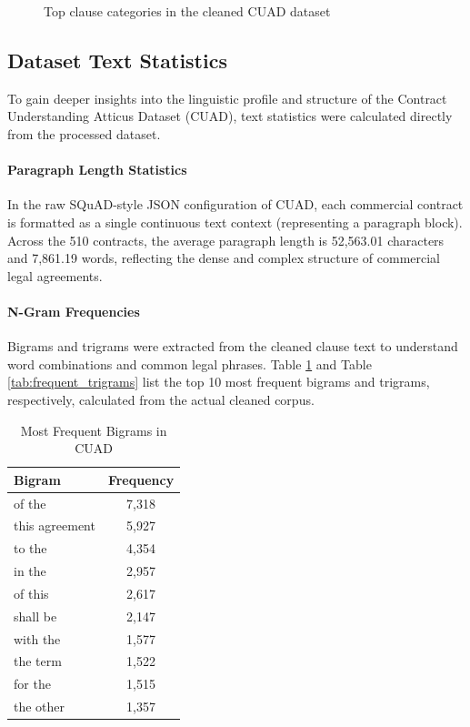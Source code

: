 \documentclass[12pt, a4paper]{report}
\begin{document}
\begin{figure}[h]
\centering
{}
\caption{Top clause categories in the cleaned CUAD dataset}
\label{fig:top_15_categories}
\end{figure}

\subsection{Dataset Text Statistics}
\label{subsec:dataset_text_statistics}
To gain deeper insights into the linguistic profile and structure of the Contract Understanding Atticus Dataset (CUAD), text statistics were calculated directly from the processed dataset.

\paragraph{Paragraph Length Statistics}
In the raw SQuAD-style JSON configuration of CUAD, each commercial contract is formatted as a single continuous text context (representing a paragraph block). Across the 510 contracts, the average paragraph length is 52,563.01 characters and 7,861.19 words, reflecting the dense and complex structure of commercial legal agreements.

\paragraph{N-Gram Frequencies}
Bigrams and trigrams were extracted from the cleaned clause text to understand word combinations and common legal phrases. Table \ref{tab:frequent_bigrams} and Table \ref{tab:frequent_trigrams} list the top 10 most frequent bigrams and trigrams, respectively, calculated from the actual cleaned corpus.

\begin{table}[h]
\centering
\small
\begin{tabular}{lc}
\toprule
Bigram & Frequency \\
\hline
of the & 7,318 \\
this agreement & 5,927 \\
to the & 4,354 \\
in the & 2,957 \\
of this & 2,617 \\
shall be & 2,147 \\
with the & 1,577 \\
the term & 1,522 \\
for the & 1,515 \\
the other & 1,357 \\
\bottomrule
\end{tabular}
\caption{Most Frequent Bigrams in CUAD}
\label{tab:frequent_bigrams}
\end{table}
\end{document}
